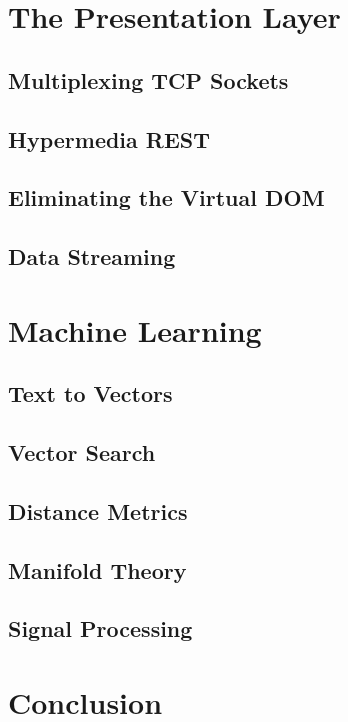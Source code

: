 \documentclass[14pt,a4paper]{extreport}
\begin{document}
\chapter{The Presentation Layer}
\section{Multiplexing TCP Sockets}
\section{Hypermedia REST}
\section{Eliminating the Virtual DOM}
\section{Data Streaming}

\chapter{Machine Learning}
\section{Text to Vectors}
\section{Vector Search}
\section{Distance Metrics}
\section{Manifold Theory}
\section{Signal Processing}

\chapter*{Conclusion}


\nocite{*}


\end{document}
